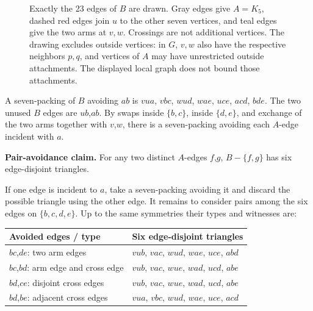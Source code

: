 \documentclass[11pt]{article}
\begin{document}
\begin{figure}[htbp]
\caption{Exactly the 23 edges of \(B\) are drawn. Gray edges give \(A=K_5\),
dashed red edges join \(u\) to the other seven vertices, and teal edges
give the two arms at \(v,w\). Crossings are not additional vertices. The
drawing excludes outside vertices: in \(G\), \(v,w\) also have the
respective neighbors \(p,q\), and vertices of \(A\) may have
unrestricted outside attachments. The displayed local graph does not
bound those attachments.}
\label{fig:final-core}
\end{figure}

A seven-packing of \(B\) avoiding \(ab\) is \(vua\), \(vbc\), \(wud\),
\(wae\), \(uce\), \(acd\), \(bde\). The two unused \(B\) edges are
\(ub\),\(ab\). By swaps inside \(\{b,c\}\), inside \(\{d,e\}\), and
exchange of the two arms together with \(v\),\(w\), there is a
seven-packing avoiding each \(A\)-edge incident with \(a\).

\textbf{Pair-avoidance claim.} For any two distinct \(A\)-edges
\(f\),\(g\), \(B-\{f,g\}\) has six edge-disjoint triangles.

If one edge is incident to \(a\), take a seven-packing avoiding it and
discard the possible triangle using the other edge. It remains to
consider pairs among the six edges on \(\{b,c,d,e\}\). Up to the same
symmetries their types and witnesses are:

{\def\LTcaptype{none} %
{\small\begin{longtable}[]{@{}
  >{\raggedright\arraybackslash}p{}
  >{\raggedright\arraybackslash}p{}@{}}
\toprule\noalign{}
\begin{minipage}[b]{\linewidth}\raggedright
Avoided edges / type
\end{minipage} & \begin{minipage}[b]{\linewidth}\raggedright
Six edge-disjoint triangles
\end{minipage} \\
\midrule\noalign{}
\endhead
\bottomrule\noalign{}
\endlastfoot
\(bc\),\(de\): two arm edges & \(vub\), \(vac\), \(wud\), \(wae\),
\(uce\), \(abd\) \\
\(bc\),\(bd\): arm edge and cross edge & \(vub\), \(vac\), \(wue\),
\(wad\), \(ucd\), \(abe\) \\
\(bd\),\(ce\): disjoint cross edges & \(vub\), \(vac\), \(wue\),
\(wad\), \(ucd\), \(abe\) \\
\(bd\),\(be\): adjacent cross edges & \(vua\), \(vbc\), \(wud\),
\(wae\), \(uce\), \(acd\) \\
\end{longtable}}
}
\end{document}

